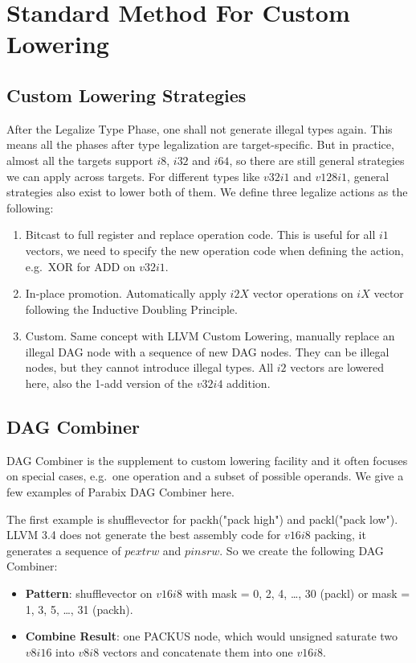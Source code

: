 \section{Standard Method For Custom Lowering}
\subsection{Custom Lowering Strategies}
After the Legalize Type Phase, one shall not generate illegal types again. This means all the phases after type legalization are target-specific. But in practice, almost all the targets support $i8$, $i32$ and $i64$, so there are still general strategies we can apply across targets. For different types like $v32i1$ and $v128i1$, general strategies also exist to lower both of them. We define three legalize actions as the following:
\begin{enumerate}
    \item Bitcast to full register and replace operation code. This is useful for all $i1$ vectors, we need to specify the new operation code when defining the action, e.g.\ XOR for ADD on $v32i1$.
    \item In-place promotion. Automatically apply $i2X$ vector operations on $iX$ vector following the Inductive Doubling Principle.
    \item Custom. Same concept with LLVM Custom Lowering, manually replace an illegal DAG node with a sequence of new DAG nodes. They can be illegal nodes, but they cannot introduce illegal types. All $i2$ vectors are lowered here, also the 1-add version of the $v32i4$ addition.
\end{enumerate}

\subsection{DAG Combiner}
DAG Combiner is the supplement to custom lowering facility and it often focuses on special cases, e.g.\ one operation and a subset of possible operands. We give a few examples of Parabix DAG Combiner here.

The first example is shufflevector for packh("pack high") and packl("pack low"). LLVM 3.4 does not generate the best assembly code for $v16i8$ packing, it generates a sequence of $pextrw$ and $pinsrw$. So we create the following DAG Combiner:
\begin{itemize}
    \item \textbf{Pattern}: shufflevector on $v16i8$ with mask = 0, 2, 4, \ldots, 30 (packl) or mask = 1, 3, 5, \ldots, 31 (packh).
    \item \textbf{Combine Result}: one PACKUS node, which would unsigned saturate two $v8i16$ into $v8i8$ vectors and concatenate them into one $v16i8$.
\end{itemize}

